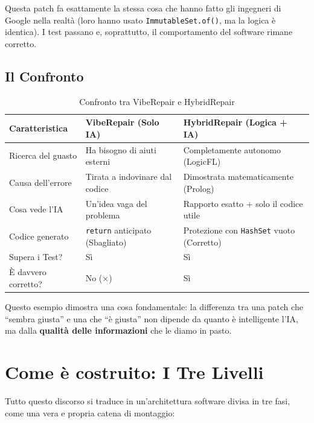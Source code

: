 Questa patch fa esattamente la stessa cosa che hanno fatto gli ingegneri di Google nella realtà 
(loro hanno usato \texttt{ImmutableSet.of()}, ma la logica è identica). I test passano e, soprattutto, 
il comportamento del software rimane corretto.

\subsection{Il Confronto}

\begin{table}[h]
\centering
\caption{Confronto tra VibeRepair e HybridRepair}
\vspace{2mm}
\begin{tabular}{lll}
\toprule
\textbf{Caratteristica} & \textbf{VibeRepair (Solo IA)} & \textbf{HybridRepair (Logica + IA)} \\
\midrule
Ricerca del guasto & Ha bisogno di aiuti esterni & Completamente autonomo (LogicFL) \\
Causa dell'errore & Tirata a indovinare dal codice & Dimostrata matematicamente (Prolog) \\
Cosa vede l'IA & Un'idea vaga del problema & Rapporto esatto + solo il codice utile \\
Codice generato & \texttt{return} anticipato (Sbagliato) & Protezione con \texttt{HashSet} vuoto (Corretto) \\
Supera i Test? & Sì  & Sì  \\
È davvero corretto? & No ($\times$) & Sì  \\
\bottomrule
\end{tabular}
\end{table}

Questo esempio dimostra una cosa fondamentale: la differenza tra una patch che ``sembra giusta'' e 
una che ``è giusta'' non dipende da quanto è intelligente l'IA, ma dalla \textbf{qualità delle informazioni} 
che le diamo in pasto.

\section{Come è costruito: I Tre Livelli}

Tutto questo discorso si traduce in un'architettura software divisa in tre fasi, come una vera e
 propria catena di montaggio:

